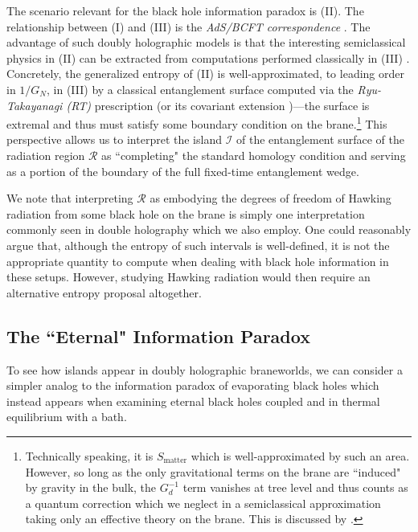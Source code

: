 \documentclass[12pt,a4paper]{article}
\begin{document}
The scenario relevant for the black hole information paradox is (II). The relationship between (I) and (III) is the \textit{AdS/BCFT correspondence} \cite{Takayanagi:2011zk,Fujita:2011fp}. The advantage of such doubly holographic models is that the interesting semiclassical physics in (II) can be extracted from computations performed classically in (III) \cite{Almheiri:2019hni,Akal:2020twv,Akal:2021foz,Chen:2020uac}. Concretely, the generalized entropy of (II) is well-approximated, to leading order in $1/G_N$, in (III) by a classical entanglement surface computed via the \textit{Ryu-Takayanagi (RT)} prescription \cite{Ryu:2006bv} (or its covariant extension \cite{Hubeny:2007xt})---the surface is extremal and thus must satisfy some boundary condition on the brane.\footnote{Technically speaking, it is $S_{\text{matter}}$ which is well-approximated by such an area. However, so long as the only gravitational terms on the brane are ``induced" by gravity in the bulk, the $G_d^{-1}$ term vanishes at tree level and thus counts as a quantum correction which we neglect in a semiclassical approximation taking only an effective theory on the brane. This is discussed by \cite{Chen:2020uac,Geng:2020fxl}.} This perspective allows us to interpret the island $\mathcal{I}$ of the entanglement surface of the radiation region $\mathcal{R}$ as ``completing" the standard homology condition and serving as a portion of the boundary of the full fixed-time entanglement wedge.

We note that interpreting $\mathcal{R}$ as embodying the degrees of freedom of Hawking radiation from some black hole on the brane is simply one interpretation commonly seen in double holography \cite{Almheiri:2019psy,Chen:2020hmv,Chen:2020uac,Geng:2020fxl,Geng:2020qvw,Geng:2021eps} which we also employ. One could reasonably argue that, although the entropy of such intervals is well-defined, it is not the appropriate quantity to compute when dealing with black hole information in these setups. However, studying Hawking radiation would then require an alternative entropy proposal altogether.

\subsection{The ``Eternal" Information Paradox}

To see how islands appear in doubly holographic braneworlds, we can consider a simpler analog to the information paradox of evaporating black holes which instead appears when examining eternal black holes coupled and in thermal equilibrium with a bath.
\end{document}
